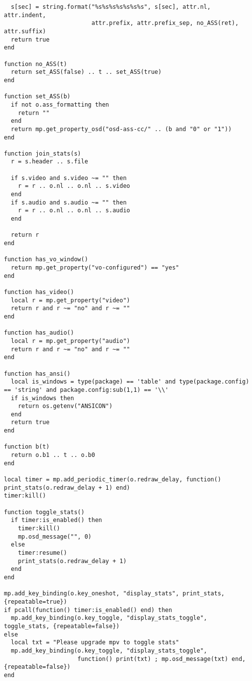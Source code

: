 \documentclass[11pt]{article}
\begin{document}
\begin{lstlisting}
  s[sec] = string.format("%s%s%s%s%s%s%s", s[sec], attr.nl, attr.indent,
                         attr.prefix, attr.prefix_sep, no_ASS(ret), attr.suffix)
  return true
end

function no_ASS(t)
  return set_ASS(false) .. t .. set_ASS(true)
end

function set_ASS(b)
  if not o.ass_formatting then
    return ""
  end
  return mp.get_property_osd("osd-ass-cc/" .. (b and "0" or "1"))
end

function join_stats(s)
  r = s.header .. s.file

  if s.video and s.video ~= "" then
    r = r .. o.nl .. o.nl .. s.video
  end
  if s.audio and s.audio ~= "" then
    r = r .. o.nl .. o.nl .. s.audio
  end

  return r
end

function has_vo_window()
  return mp.get_property("vo-configured") == "yes"
end

function has_video()
  local r = mp.get_property("video")
  return r and r ~= "no" and r ~= ""
end

function has_audio()
  local r = mp.get_property("audio")
  return r and r ~= "no" and r ~= ""
end

function has_ansi()
  local is_windows = type(package) == 'table' and type(package.config) == 'string' and package.config:sub(1,1) == '\\'
  if is_windows then
    return os.getenv("ANSICON")
  end
  return true
end

function b(t)
  return o.b1 .. t .. o.b0
end

local timer = mp.add_periodic_timer(o.redraw_delay, function() print_stats(o.redraw_delay + 1) end)
timer:kill()

function toggle_stats()
  if timer:is_enabled() then
    timer:kill()
    mp.osd_message("", 0)
  else
    timer:resume()
    print_stats(o.redraw_delay + 1)
  end
end

mp.add_key_binding(o.key_oneshot, "display_stats", print_stats, {repeatable=true})
if pcall(function() timer:is_enabled() end) then
  mp.add_key_binding(o.key_toggle, "display_stats_toggle", toggle_stats, {repeatable=false})
else
  local txt = "Please upgrade mpv to toggle stats"
  mp.add_key_binding(o.key_toggle, "display_stats_toggle",
                     function() print(txt) ; mp.osd_message(txt) end, {repeatable=false})
end
\end{lstlisting}
\end{document}
